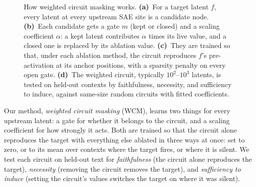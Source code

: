 \documentclass[10pt]{article}
\begin{document}
\begin{figure}[t]
\centering
\resizebox{\linewidth}{!}{}
\caption{How weighted circuit masking works.
\textbf{(a)}~For a target latent $f$, every latent at every upstream SAE site is a candidate node.
\textbf{(b)}~Each candidate gets a gate $m$ (kept or closed) and a scaling coefficient $\alpha$: a kept latent contributes $\alpha$ times its live value, and a closed one is replaced by its ablation value.
\textbf{(c)}~They are trained so that, under each ablation method, the circuit reproduces $f$'s pre-activation at its anchor positions, with a sparsity penalty on every open gate.
\textbf{(d)}~The weighted circuit, typically $10^{2}$--$10^{3}$ latents, is tested on held-out contexts by faithfulness, necessity, and sufficiency to induce, against same-size random circuits with fitted coefficients.}
\label{fig:overview}
\end{figure}

Our method, \emph{weighted circuit masking} (WCM), learns two things for every upstream latent: a gate for whether it belongs to the circuit, and a scaling coefficient for how strongly it acts.
Both are trained so that the circuit alone reproduces the target with everything else ablated in three ways at once: set to zero, or to its mean over contexts where the target fires, or where it is silent.
We test each circuit on held-out text for \emph{faithfulness} (the circuit alone reproduces the target), \emph{necessity} (removing the circuit removes the target), and \emph{sufficiency to induce} (setting the circuit's values switches the target on where it was silent).
\end{document}
